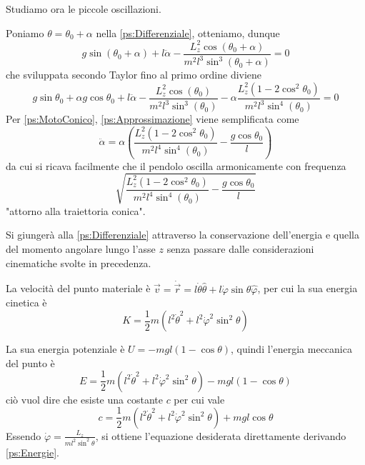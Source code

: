 \documentclass[../main.tex]{subfiles}
\begin{document}
Studiamo ora le piccole oscillazioni.

Poniamo $\theta=\theta_0+\alpha$ nella \cref{ps:Differenziale}, otteniamo, dunque
$$ g\sin(\theta_0+\alpha)+l\ddot{\alpha}-\frac{L_z^2\cos(\theta_0+\alpha)}{m^2l^3\sin^3(\theta_0+\alpha)}=0 $$
che sviluppata secondo Taylor fino al primo ordine diviene
\begin{equation}\label{ps:Approssimazione}
g\sin\theta_0+\alpha g\cos\theta_0+l\ddot{\alpha}-\frac{L_z^2\cos(\theta_0)}{m^2l^3\sin^3(\theta_0)}-\alpha\frac{L_z^2(1-2\cos^2\theta_0)}{m^2l^3\sin^4(\theta_0)}=0
\end{equation}
Per \cref{ps:MotoConico}, \cref{ps:Approssimazione} viene semplificata come
\begin{equation}
\ddot{\alpha}=\alpha\left({\frac{L_z^2(1-2\cos^2\theta_0)}{m^2l^4\sin^4(\theta_0)}-\frac{g\cos\theta_0}{l}}\right)
\end{equation}
da cui si ricava facilmente che il pendolo oscilla armonicamente con frequenza $$\sqrt{\frac{L_z^2(1-2\cos^2\theta_0)}{m^2l^4\sin^4(\theta_0)}-\frac{g\cos\theta_0}{l}}$$ "attorno alla traiettoria conica".

\solution[2]
Si giunger\`a alla \cref{ps:Differenziale} attraverso la conservazione dell'energia e quella del momento angolare lungo l'asse $z$ senza passare dalle considerazioni cinematiche svolte in precedenza.

La velocit\`a del punto materiale \`e $\vec{v}=\dot{\vec{r}}=l\dot{\theta}\hat{\theta}+l\dot{\varphi}\sin\theta\hat{\varphi}$, per cui la sua energia cinetica \`e
\begin{equation*}
	K=\frac 12 m(l^2\dot{\theta}^2+l^2\dot{\varphi}^2\sin^2\theta)
\end{equation*}


La sua energia potenziale \`e $U=-mgl(1-\cos\theta)$, quindi l'energia meccanica del punto \`e
\begin{equation*}
 E=\frac 12 m(l^2\dot{\theta}^2+l^2\dot{\varphi}^2\sin^2\theta)-mgl(1-\cos\theta)
\end{equation*}
ci\`o vuol dire che esiste una costante $c$ per cui vale
\begin{equation}\label{ps:Energie}
c=\frac 12 m(l^2\dot{\theta}^2+l^2\dot{\varphi}^2\sin^2\theta)+mgl\cos\theta
\end{equation}
Essendo $\displaystyle \dot{\varphi}=\frac{L_z}{ml^2\sin^2\theta}$, si ottiene l'equazione desiderata direttamente derivando \cref{ps:Energie}. 
\end{document}

